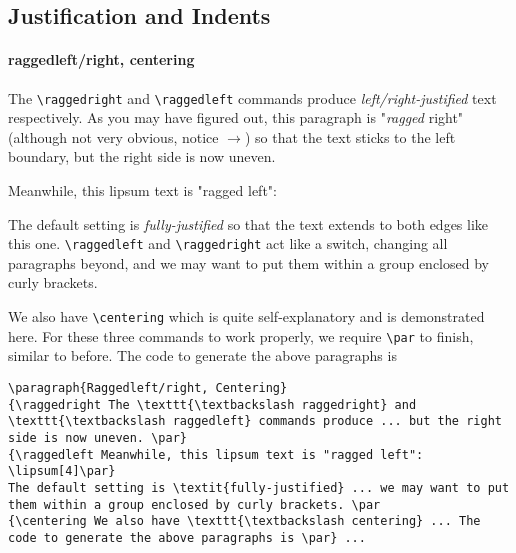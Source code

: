 \subsection{Justification and Indents}

\paragraph{raggedleft/right, centering}
{\raggedright The \texttt{\textbackslash raggedright} and \texttt{\textbackslash raggedleft} commands produce \textit{left/right-justified} text respectively. As you may have figured out, this paragraph is "\textit{ragged} right" (although not very obvious, notice $\rightarrow$) so that the text sticks to the left boundary, but the right side is now uneven. \par}
{\raggedleft Meanwhile, this lipsum text is "ragged left": \lipsum[4]\par}
The default setting is \textit{fully-justified} so that the text extends to both edges like this one. \texttt{\textbackslash raggedleft} and \texttt{\textbackslash raggedright} act like a switch, changing all paragraphs beyond, and we may want to put them within a group enclosed by curly brackets. \par
{\centering We also have \texttt{\textbackslash centering} which is quite self-explanatory and is demonstrated here. For these three commands to work properly, we require \texttt{\textbackslash par} to finish, similar to before. The code to generate the above paragraphs is \par}
\begin{lstlisting}
\paragraph{Raggedleft/right, Centering}
{\raggedright The \texttt{\textbackslash raggedright} and \texttt{\textbackslash raggedleft} commands produce ... but the right side is now uneven. \par}
{\raggedleft Meanwhile, this lipsum text is "ragged left": \lipsum[4]\par}
The default setting is \textit{fully-justified} ... we may want to put them within a group enclosed by curly brackets. \par
{\centering We also have \texttt{\textbackslash centering} ... The code to generate the above paragraphs is \par} ...
\end{lstlisting}

